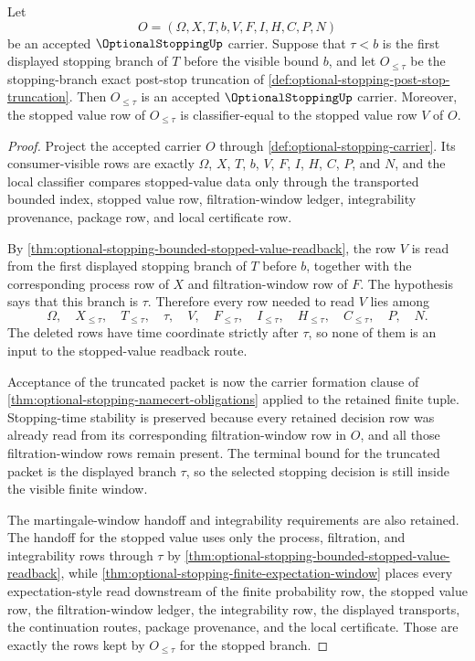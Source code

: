 \begin{lemma}
\label{lem:optional-stopping-post-stop-tail-erasure}
Let
$$
O=(\Omega,X,T,b,V,F,I,H,C,P,N)
$$
be an accepted $\OptionalStoppingUp$ carrier. Suppose that $\tau<b$ is the first displayed stopping branch of $T$ before the visible bound $b$, and let $O_{\leq\tau}$ be the stopping-branch exact post-stop truncation of \autoref{def:optional-stopping-post-stop-truncation}. Then $O_{\leq\tau}$ is an accepted $\OptionalStoppingUp$ carrier. Moreover, the stopped value row of $O_{\leq\tau}$ is classifier-equal to the stopped value row $V$ of $O$.
\end{lemma}
\begin{proof}
Project the accepted carrier $O$ through \autoref{def:optional-stopping-carrier}. Its consumer-visible rows are exactly $\Omega$, $X$, $T$, $b$, $V$, $F$, $I$, $H$, $C$, $P$, and $N$, and the local classifier compares stopped-value data only through the transported bounded index, stopped value row, filtration-window ledger, integrability provenance, package row, and local certificate row.

By \autoref{thm:optional-stopping-bounded-stopped-value-readback}, the row $V$ is read from the first displayed stopping branch of $T$ before $b$, together with the corresponding process row of $X$ and filtration-window row of $F$. The hypothesis says that this branch is $\tau$. Therefore every row needed to read $V$ lies among
$$
\Omega,\quad X_{\leq\tau},\quad T_{\leq\tau},\quad \tau,\quad V,\quad F_{\leq\tau},\quad I_{\leq\tau},\quad H_{\leq\tau},\quad C_{\leq\tau},\quad P,\quad N.
$$
The deleted rows have time coordinate strictly after $\tau$, so none of them is an input to the stopped-value readback route.

Acceptance of the truncated packet is now the carrier formation clause of \autoref{thm:optional-stopping-namecert-obligations} applied to the retained finite tuple. Stopping-time stability is preserved because every retained decision row was already read from its corresponding filtration-window row in $O$, and all those filtration-window rows remain present. The terminal bound for the truncated packet is the displayed branch $\tau$, so the selected stopping decision is still inside the visible finite window.

The martingale-window handoff and integrability requirements are also retained. The handoff for the stopped value uses only the process, filtration, and integrability rows through $\tau$ by \autoref{thm:optional-stopping-bounded-stopped-value-readback}, while \autoref{thm:optional-stopping-finite-expectation-window} places every expectation-style read downstream of the finite probability row, the stopped value row, the filtration-window ledger, the integrability row, the displayed transports, the continuation routes, package provenance, and the local certificate. Those are exactly the rows kept by $O_{\leq\tau}$ for the stopped branch.


\end{proof}
